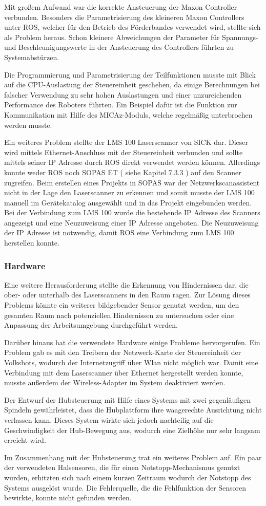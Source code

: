 Mit großem Aufwand war die korrekte Ansteuerung der Maxon Controller verbunden. Besonders die Parametrisierung des kleineren Maxon Controllers unter ROS, welcher für den Betrieb des Förderbandes verwendet wird, stellte sich als Problem heraus. Schon kleinere Abweichungen der Parameter für Spannungs- und Beschleunigungswerte in der Ansteuerung des Controllers führten zu Systemabstürzen.
 
Die Programmierung und Parametrisierung der Teilfunktionen musste mit Blick auf
die CPU-Auslastung der Steuereinheit geschehen, da einige Berechnungen bei falscher
Verwendung zu sehr hohen Auslastungen und einer unzureichenden Performance des
Roboters führten. Ein Beispiel dafür ist die Funktion zur Kommunikation mit Hilfe des MICAz-Moduls, welche     regelmäßig unterbrochen werden musste.

Ein weiteres Problem stellte der LMS 100 Laserscanner von SICK dar. Dieser wird mittels Ethernet-Anschluss mit der Steuereinheit verbunden und sollte mittels seiner IP Adresse durch ROS direkt verwendet werden können. Allerdings konnte weder ROS noch SOPAS ET ( siehe Kapitel 7.3.3 ) auf den Scanner zugreifen. Beim erstellen eines Projekts in SOPAS war der Netzwerkscanassistent nicht in der Lage den Laserscanner zu erkennen und somit musste der LMS 100 manuell im Gerätekatalog ausgewählt und in das Projekt eingebunden werden. Bei der Verbindung zum LMS 100 wurde die bestehende IP Adresse des Scanners angezeigt und eine Neuzuweisung einer IP Adresse angeboten. Die Neuzuweisung der IP Adresse ist notwendig, damit ROS eine Verbindung zum LMS 100 herstellen konnte.

\subsubsection{Hardware}

Eine weitere Herausforderung stellte die Erkennung von Hindernissen dar, die ober- oder unterhalb des Laserscanners in den Raum ragen. Zur Lösung dieses Problems könnte ein weiterer bildgebender Sensor genutzt werden, um den gesamten Raum nach potenziellen Hindernissen zu untersuchen oder eine Anpassung der Arbeitsumgebung durchgeführt werden.

Darüber hinaus hat die verwendete Hardware einige Probleme hervorgerufen. Ein Problem gab es mit den Treibern der Netzwerk-Karte der Steuereinheit der Volksbots, wodurch der Internetzugriff über Wlan nicht möglich war. Damit eine Verbindung mit dem Laserscanner über Ethernet hergestellt werden konnte, musste außerdem der Wireless-Adapter im System deaktiviert werden.

Der Entwurf der Hubsteuerung mit Hilfe eines Systems mit zwei gegenläufigen Spindeln gewährleistet, dass die Hubplattform ihre waagerechte Ausrichtung nicht verlassen kann. Dieses System wirkte sich jedoch nachteilig auf die Geschwindigkeit der Hub-Bewegung aus, wodurch eine Zielhöhe nur sehr langsam erreicht wird.

Im Zusammenhang mit der Hubsteuerung trat ein weiteres Problem auf. Ein paar der verwendeten Halsensoren, die für einen Notstopp-Mechanismus genutzt wurden, erhitzten sich nach einem kurzen Zeitraum wodurch der Notstopp des Systems ausgelöst wurde. Die Fehlerquelle, die die Fehlfunktion der Sensoren bewirkte, konnte nicht gefunden werden.